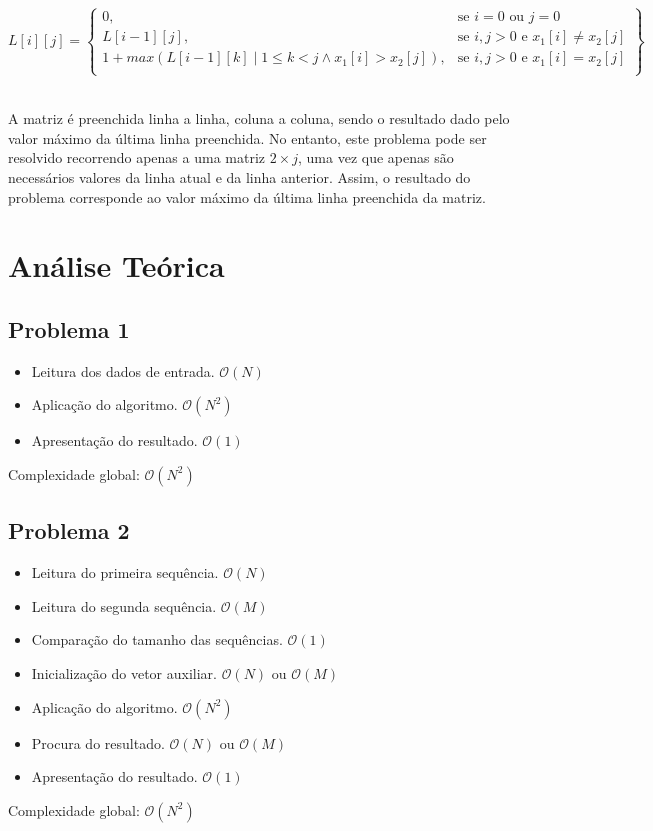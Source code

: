 \documentclass[12pt, letterpaper]{article}
\begin{document}
\begin{center}
	\[
	L[i][j] = \left\{\begin{array}{lr}
		0, & \text{se } i = 0 \text{ ou } j = 0\\
		L[i-1][j], & \text{se } i,j > 0 \text{ e } x_1[i] \neq x_2[j]\\
		1 +	max(L[i-1][k] \mid 1 \leq k < j \land x_1[i] > x_2[j]), & \text{se } i,j > 0 \text{ e } x_1[i] = x_2[j]\\
        \end{array}\right\}
	\]\\[\baselineskip]
\end{center}

A matriz é preenchida linha a linha, coluna a coluna, sendo o resultado dado
pelo valor máximo da última linha preenchida.
No entanto, este problema pode ser resolvido recorrendo apenas a uma matriz $2
\times j$, uma vez que apenas são necessários valores da linha atual e da linha
anterior. Assim, o resultado do problema corresponde ao valor máximo da última
linha preenchida da matriz.


\pagebreak
\section{Análise Teórica}

\subsection{Problema 1}
\begin{itemize}
	\item Leitura dos dados de entrada. $\mathcal{O}(N)$
	\item Aplicação do algoritmo. $\mathcal{O}(N^2)$
	\item Apresentação do resultado. $\mathcal{O}(1)$
\end{itemize}
Complexidade global: $\mathcal{O}(N^2)$

\subsection{Problema 2}
\begin{itemize}
	\item Leitura do primeira sequência. $\mathcal{O}(N)$
	\item Leitura do segunda sequência. $\mathcal{O}(M)$
	\item Comparação do tamanho das sequências. $\mathcal{O}(1)$
	\item Inicialização do vetor auxiliar. $\mathcal{O}(N)$ ou $\mathcal{O}(M)$
	\item Aplicação do algoritmo. $\mathcal{O}(N^2)$
	\item Procura do resultado. $\mathcal{O}(N)$ ou $\mathcal{O}(M)$
	\item Apresentação do resultado. $\mathcal{O}(1)$
\end{itemize}
Complexidade global: $\mathcal{O}(N^2)$
\end{document}
